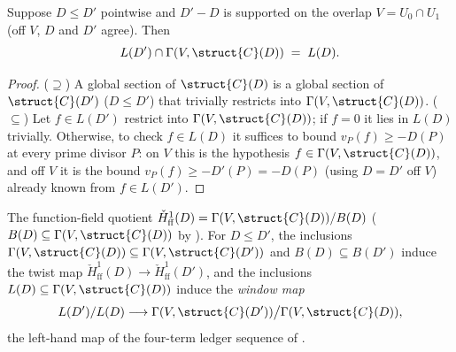 \begin{theorem}
  \label{thm:adelic_linearSystem_inf_overlap_eq}
  \leanok
  Suppose \(D \le D'\) pointwise and \(D' - D\) is supported on the
  overlap \(V = U_0 \cap U_1\) (off \(V\), \(D\) and \(D'\) agree). Then
  \[
    L(D') \cap \Gamma(V, \struct{C}(D)) \;=\; L(D).
  \]
\end{theorem}
\begin{proof}
  \leanok
  (\(\supseteq\)) A global section of \(\struct{C}(D)\) is a global
  section of \(\struct{C}(D')\) (\(D \le D'\)) that trivially restricts
  into \(\Gamma(V, \struct{C}(D))\). (\(\subseteq\)) Let \(f \in L(D')\)
  restrict into \(\Gamma(V, \struct{C}(D))\); if \(f = 0\) it lies in
  \(L(D)\) trivially. Otherwise, to check \(f \in L(D)\) it suffices to
  bound \(v_P(f) \ge -D(P)\) at every prime divisor \(P\): on \(V\) this
  is the hypothesis \(f \in \Gamma(V, \struct{C}(D))\), and off \(V\) it
  is the bound \(v_P(f) \ge -D'(P) = -D(P)\) (using \(D = D'\) off
  \(V\)) already known from \(f \in L(D')\).
\end{proof}

\begin{definition}
  \label{def:adelic_H1_window}
  \leanok
  The function-field quotient \(\check{H}^1_{\mathrm{ff}}(D) = \Gamma(V,
  \struct{C}(D))/B(D)\) (\(B(D) \subseteq \Gamma(V, \struct{C}(D))\) by
  ). For \(D \le D'\), the
  inclusions \(\Gamma(V, \struct{C}(D)) \subseteq \Gamma(V,
  \struct{C}(D'))\) and \(B(D) \subseteq B(D')\) induce the twist map
  \(\check{H}^1_{\mathrm{ff}}(D) \to
  \check{H}^1_{\mathrm{ff}}(D')\), and the inclusions \(L(D)
  \subseteq \Gamma(V, \struct{C}(D))\) induce the \emph{window map}
  \[
    L(D')/L(D) \longrightarrow \Gamma(V, \struct{C}(D'))\big/
      \Gamma(V, \struct{C}(D)),
  \]
  the left-hand map of the four-term ledger sequence of
  .
\end{definition}

